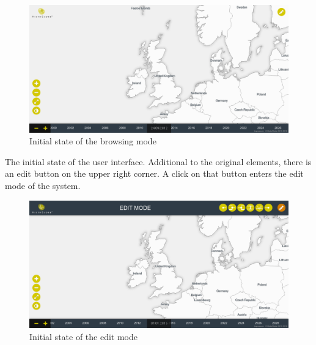 \begin{landscape}

  \begin{minipage}[t]{10cm}

    \begin{figure}[H]
      \centering
      \includegraphics[width=1.0\textwidth]{graphics/development/user_interface_design_process/1_init.png}
      \caption{Initial state of the browsing mode}
      \label{fig:final_1_init}
    \end{figure}

    The initial state of the user interface. Additional to the original elements, there is an edit button on the upper right corner. A click on that button enters the edit mode of the system.

  \end{minipage}    %
  \hspace{1.5em}    %
  \begin{minipage}[t]{10cm}

    \begin{figure}[H]
      \centering
      \includegraphics[width=1.0\textwidth]{graphics/development/user_interface_design_process/2_edit_mode.png}
      \caption{Initial state of the edit mode}
      \label{fig:final_2_edit_mode}
    \end{figure}


\end{minipage}
\end{landscape}
